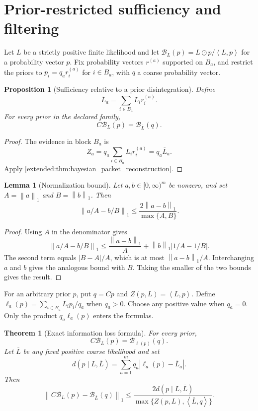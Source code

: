 \documentclass[11pt,letterpaper]{article}
\newtheorem{theorem}{Theorem}[section]
\theoremstyle{plain}
\newtheorem{proposition}[proposition]{Proposition}
\theoremstyle{plain}
\newtheorem{lemma}[lemma]{Lemma}
\theoremstyle{plain}
\theoremstyle{definition}
\theoremstyle{definition}
\theoremstyle{definition}
\theoremstyle{definition}
\theoremstyle{definition}
\theoremstyle{remark}
\theoremstyle{remark}
\theoremstyle{remark}
\theoremstyle{remark}
\theoremstyle{remark}
\newcommand{\norm}[1]{\left\lVert#1\right\rVert}
\theoremstyle{remark}
\newcommand{\Bcal}{\mathcal B}
\newcommand{\abs}[1]{\left\lvert#1\right\rvert}
\newcommand{\ip}[2]{\left\langle#1,#2\right\rangle}
\let\KomorebiPrimitiveMathcal\mathcal
\renewcommand{\mathcal}[1]{{\KomorebiPrimitiveMathcal{#1}}}
\begin{document}
\FloatBarrier
\section{Prior-restricted sufficiency and filtering}\label{earlier:section:03}
Let $L$ be a strictly positive finite likelihood and let $\Bcal_L(p)=L\odot p/\ip{L}{p}$ for a probability vector $p$. Fix probability vectors $r^{(a)}$ supported on $B_a$, and restrict the priors to $p_i=q_a r_i^{(a)}$ for $i\in B_a$, with $q$ a coarse probability vector.
\begin{proposition}[Sufficiency relative to a prior disintegration]\label{earlier:record:011}\label{earlier:prop:relative_sufficiency}
Define
\[
\overline L_a
=
\sum_{i\in B_a}L_ir_i^{(a)}.
\]
For every prior in the declared family,
\[
C\Bcal_L(p)
=
\Bcal_{\overline L}(q).
\]
\end{proposition}

\begin{proof}
The evidence in block \(B_a\) is
\[
Z_a
=q_a\sum_{i\in B_a}L_ir_i^{(a)}
=q_a\overline L_a.
\]
Apply \cref{extended:thm:bayesian_packet_reconstruction}.
\end{proof}

\begin{lemma}[Normalization bound]\label{earlier:record:012}\label{earlier:lem:normalization_bound}
Let \(a,b\in[0,\infty)^m\) be nonzero, and set \(A=\norm a_1\) and \(B=\norm b_1\). Then
\[
\boxed{
\norm{a/A-b/B}_1
\leq
\frac{2\norm{a-b}_1}{\max\{A,B\}}.
}
\]
\end{lemma}

\begin{proof}
Using \(A\) in the denominator gives
\[
\norm{a/A-b/B}_1
\leq
\frac{\norm{a-b}_1}{A}
+
\norm b_1\abs{1/A-1/B}.
\]
The second term equals \(\abs{B-A}/A\), which is at most \(\norm{a-b}_1/A\). Interchanging \(a\) and \(b\) gives the analogous bound with \(B\). Taking the smaller of the two bounds gives the result.
\end{proof}


For an arbitrary prior $p$, put $q=Cp$ and $Z(p,L)=\ip{L}{p}$. Define $\ell_a(p)=\sum_{i\in B_a}L_ip_i/q_a$ when $q_a>0$. Choose any positive value when $q_a=0$. Only the product $q_a\ell_a(p)$ enters the formulas.
\begin{theorem}[Exact information loss formula]\label{earlier:record:013}\label{earlier:thm:information_loss}
For every prior,
\[
\boxed{
C\Bcal_L(p)
=
\Bcal_{\ell(p)}(q).
}
\]
Let \(\overline L\) be any fixed positive coarse likelihood and set
\[
d(p\mid L,\overline L)
=
\sum_{a=1}^mq_a\abs{\ell_a(p)-\overline L_a}.
\]
Then
\[
\norm{
C\Bcal_L(p)-\Bcal_{\overline L}(q)
}_1
\leq
\frac{2d(p\mid L,\overline L)}
{\max\{Z(p,L),\ip{\overline L}{q}\}}.
\]
\end{theorem}
\end{document}
